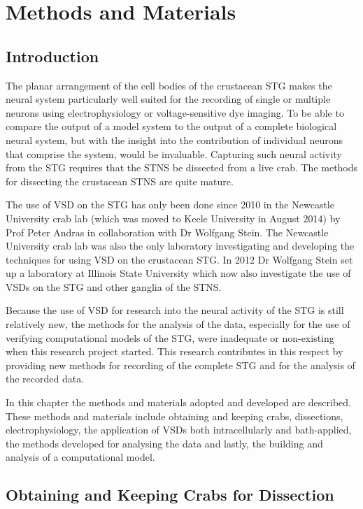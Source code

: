 \chapter{Methods and Materials}
\label{chap:methodsAndMaterials}
\acresetall
\section{Introduction}
\label{sec:introduction}
The planar arrangement of the cell bodies of the crustacean \ac{STG} makes the neural system particularly well suited for the recording of single or multiple neurons using electrophysiology or voltage-sensitive dye imaging. To be able to compare the output of a model system to the output of a complete biological neural system, but with the insight into the contribution of individual neurons that comprise the system, would be invaluable. Capturing such neural activity from the \ac{STG} requires that the \ac{STNS} be dissected from a live crab. The methods for dissecting the crustacean \ac{STNS} are quite mature. 

The use of \ac{VSD} on the \ac{STG} has only been done since 2010 in the Newcastle University crab lab (which was moved to Keele University in August 2014) by Prof Peter Andras in collaboration with Dr Wolfgang Stein. The Newcastle University crab lab was also the only laboratory investigating and developing the techniques for using \ac{VSD} on the crustacean \ac{STG}. In 2012 Dr Wolfgang Stein set up a laboratory at Illinois State University which now also investigate the use of \acp{VSD} on the \ac{STG} and other ganglia of the \ac{STNS}.

Because the use of \ac{VSD} for research into the neural activity of the \ac{STG} is still relatively new, the methods for the analysis of the data, especially for the use of verifying computational models of the \ac{STG}, were inadequate or non-existing when this research project started. This research contributes in this respect by providing new methods for recording of the complete \ac{STG} and for the analysis of the recorded data.

In this chapter the methods and materials adopted and developed are described. These methods and materials include obtaining and keeping crabs, dissections, electrophysiology, the application of \acp{VSD} both intracellularly and bath-applied, the methods developed for analysing the data and lastly, the building and analysis of a computational model.

\section{Obtaining and Keeping Crabs for Dissection}
\label{sec:obtaining_crabs}

